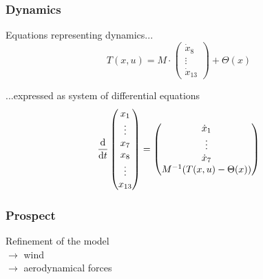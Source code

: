 	\begin{frame}
		\frametitle{Dynamics}
		Equations representing dynamics...
		\[ T(x, u) = M \cdot \begin{pmatrix} \dot{x}_{8} \\ \vdots \\ \dot{x}_{13} \end{pmatrix} + \Theta(x) \]
		
		...expressed as system of differential equations
		\[ \frac{\textup{d}}{\textup{d}t} 
			\begin{pmatrix}
						  x_{1} \\ \vdots \\ x_{7} \\ x_{8} \\ \vdots \\ x_{13}
			\end{pmatrix}
			=
			\begin{pmatrix}
							\dot{x}_{1} \\ \vdots \\ \dot{x}_{7} \\ M^{-1}(T(x,u)-\Theta(x))
			\end{pmatrix}
		\]
	\end{frame}
	
	\begin{frame}
		\frametitle{Prospect}
			Refinement of the model \\
			\vspace{1em}
			\(\rightarrow\) wind \\
			\vspace{1em}
			\(\rightarrow\) aerodynamical forces \\
		\end{frame}

%


%